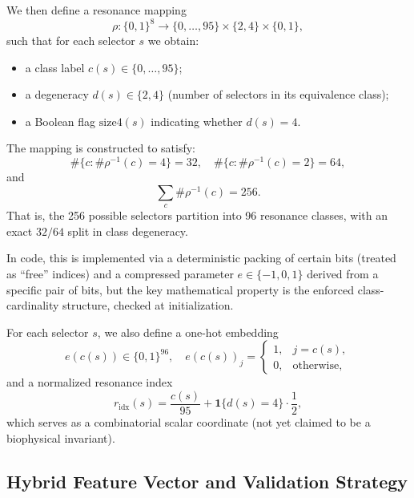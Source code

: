\documentclass[11pt]{article}
\begin{document}
We then define a resonance mapping
\begin{equation}
  \rho : \{0,1\}^8 \to \{0,\dots,95\} \times \{2,4\} \times \{0,1\},
\end{equation}
such that for each selector $s$ we obtain:
\begin{itemize}
  \item a class label $c(s)\in\{0,\dots,95\}$;
  \item a degeneracy $d(s)\in\{2,4\}$ (number of selectors in its equivalence class);
  \item a Boolean flag $\mathrm{size4}(s)$ indicating whether $d(s)=4$.
\end{itemize}
The mapping is constructed to satisfy:
\begin{equation}
 \#\{c : \#\rho^{-1}(c) = 4\} = 32,\quad
 \#\{c : \#\rho^{-1}(c) = 2\} = 64,
\end{equation}
and
\begin{equation}
 \sum_{c} \#\rho^{-1}(c) = 256.
\end{equation}
That is, the 256 possible selectors partition into 96 resonance classes, with an exact $32/64$ split in class degeneracy.\cite{glyphengine}

In code, this is implemented via a deterministic packing of certain bits (treated as ``free'' indices) and a compressed parameter $e\in\{-1,0,1\}$ derived from a specific pair of bits, but the key mathematical property is the enforced class-cardinality structure, checked at initialization.

For each selector $s$, we also define a one-hot embedding
\begin{equation}
 e(c(s)) \in \{0,1\}^{96},\quad e(c(s))_j =
 \begin{cases}
 1, & j=c(s),\\
 0, & \text{otherwise},
 \end{cases}
\end{equation}
and a normalized resonance index
\begin{equation}
 r_{\text{idx}}(s) = \frac{c(s)}{95} + \mathbf{1}\{d(s)=4\}\cdot \frac{1}{2},
\end{equation}
which serves as a combinatorial scalar coordinate (not yet claimed to be a biophysical invariant).\cite{glyphengine}

\subsection{Hybrid Feature Vector and Validation Strategy}
\end{document}
